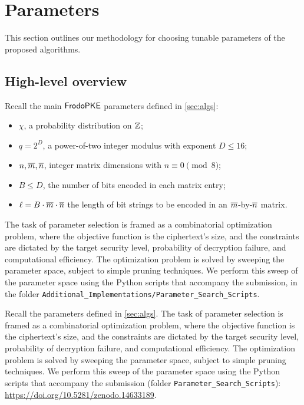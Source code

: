 \section{Parameters}%
\label{sec:params}

\ifshoworiginal
This section outlines our methodology for choosing tunable parameters of the proposed algorithms. 

\subsection{High-level overview}

Recall the main $\textsf{\upshape\mdseries FrodoPKE}$ parameters defined in
\autoref{sec:algs}:
\begin{itemize}
  \item $\chi$, a probability distribution on $\mathbb{Z}$;
  \item $q=2^D$, a power-of-two integer modulus with exponent $D \leq 16$;
  \item $n,\overline{m},\overline{n}$, integer matrix dimensions with $n \equiv 0 \pmod 8$;
  \item $B\leq D$, the number of bits encoded in each matrix entry;
  \item $\ell=B\cdot \overline{m}\cdot\overline{n}$ the length of bit strings to be encoded in an $\overline{m}$-by-$\overline{n}$ matrix.
\end{itemize}

The task of parameter selection is framed as a combinatorial
optimization problem, where the objective function is the ciphertext's
size, and the constraints are dictated by the target security level,
probability of decryption failure, and computational efficiency. The
optimization problem is solved by sweeping the parameter space,
subject to simple pruning techniques.  We perform this sweep of the
parameter space using the Python scripts that accompany the
submission, in the folder
\texttt{Additional\_Implementations/Parameter\_Search\_Scripts}.

\else

Recall the \FrodoPKE parameters defined in \autoref{sec:algs}.
The task of parameter selection is framed as a combinatorial
optimization problem, where the objective function is the ciphertext's
size, and the constraints are dictated by the target security level,
probability of decryption failure, and computational efficiency. The
optimization problem is solved by sweeping the parameter space,
subject to simple pruning techniques.  We perform this sweep of the
parameter space using the Python scripts that accompany the
submission (folder \texttt{Parameter\_Search\_Scripts}):
\url{https://doi.org/10.5281/zenodo.14633189}.
\fi

